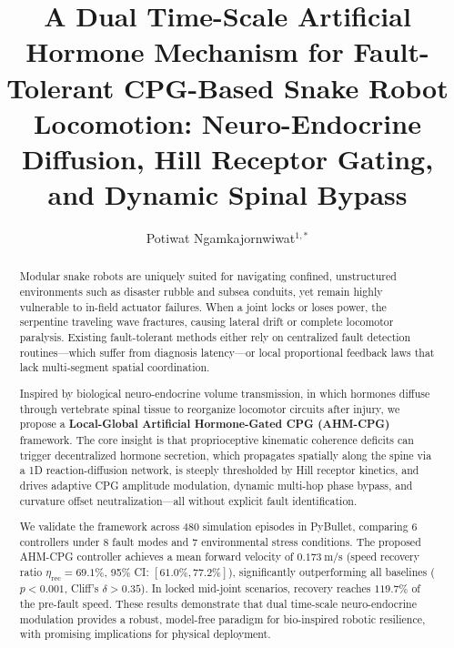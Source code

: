 \documentclass{iopjournal}
\begin{document}

\title{A Dual Time-Scale Artificial Hormone Mechanism for Fault-Tolerant CPG-Based Snake Robot Locomotion: Neuro-Endocrine Diffusion, Hill Receptor Gating, and Dynamic Spinal Bypass}

\author{Potiwat Ngamkajornwiwat$^{1,*}$}





\begin{abstract}
Modular snake robots are uniquely suited for navigating confined, unstructured environments such as disaster rubble and subsea conduits, yet remain highly vulnerable to in-field actuator failures. When a joint locks or loses power, the serpentine traveling wave fractures, causing lateral drift or complete locomotor paralysis. Existing fault-tolerant methods either rely on centralized fault detection routines—which suffer from diagnosis latency—or local proportional feedback laws that lack multi-segment spatial coordination.

Inspired by biological neuro-endocrine volume transmission, in which hormones diffuse through vertebrate spinal tissue to reorganize locomotor circuits after injury, we propose a \textbf{Local-Global Artificial Hormone-Gated CPG (AHM-CPG)} framework. The core insight is that proprioceptive kinematic coherence deficits can trigger decentralized hormone secretion, which propagates spatially along the spine via a 1D reaction-diffusion network, is steeply thresholded by Hill receptor kinetics, and drives adaptive CPG amplitude modulation, dynamic multi-hop phase bypass, and curvature offset neutralization—all without explicit fault identification.

We validate the framework across 480 simulation episodes in PyBullet, comparing 6 controllers under 8 fault modes and 7 environmental stress conditions. The proposed AHM-CPG controller achieves a mean forward velocity of $\SI{0.173}{\metre\per\second}$ (speed recovery ratio $\eta_{\text{rec}} = 69.1\%$, 95\% CI: $[61.0\%, 77.2\%]$), significantly outperforming all baselines ($p < 0.001$, Cliff's $\delta > 0.35$). In locked mid-joint scenarios, recovery reaches $119.7\%$ of the pre-fault speed. These results demonstrate that dual time-scale neuro-endocrine modulation provides a robust, model-free paradigm for bio-inspired robotic resilience, with promising implications for physical deployment.
\end{abstract}
\end{document}
